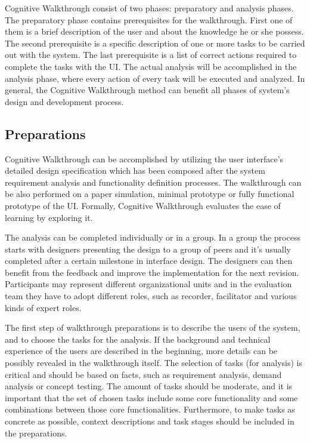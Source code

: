 \documentclass[12pt,a4paper,oneside,pdftex]{report}
\begin{document}
Cognitive Walkthrough consist of two phases: preparatory and analysis phases. The preparatory phase contains prerequisites for the walkthrough. First one of them is a brief description of the user and about the knowledge he or she possess. The second prerequisite is a specific description of one or more tasks to be carried out with the system. The last prerequisite is a list of correct actions required to complete the tasks with the UI. The actual analysis will be accomplished in the analysis phase, where every action of every task will be executed and analyzed. In general, the Cognitive Walkthrough method can benefit all phases of system's design and development process.\cite{RefWorks:26, RefWorks:34}

\subsection{Preparations}
Cognitive Walkthrough can be accomplished by utilizing the user interface's detailed design specification which has been composed after the system requirement analysis and functionality definition processes. The walkthrough can be also performed on a paper simulation, minimal prototype or fully functional prototype of the UI. Formally, Cognitive Walkthrough evaluates the ease of learning by exploring it. \cite{RefWorks:26}

The analysis can be completed individually or in a group. In a group the process starts with designers presenting the design to a group of peers and it's usually completed after a certain milestone in interface design. The designers can then benefit from the feedback and improve the implementation for the next revision. Participants may represent different organizational units and in the evaluation team they have to adopt different roles, such as recorder, facilitator and various kinds of expert roles. \cite{RefWorks:26}

The first step of walkthrough preparations is to describe the users of the system, and to choose the tasks for the analysis. If the background and technical experience of the users are described in the beginning, more details can be possibly revealed in the walkthrough itself. The selection of tasks (for analysis) is critical and should be based on facts, such as requirement analysis, demand analysis or concept testing. The amount of tasks should be moderate, and it is important that the set of chosen tasks include some core functionality and some combinations between those core functionalities. Furthermore, to make tasks as concrete as possible, context descriptions and task stages should be included in the preparations. \cite{RefWorks:26}
\end{document}
